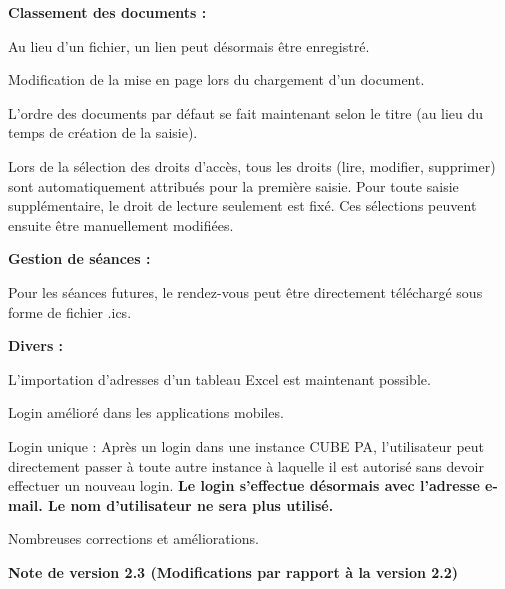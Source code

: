 \textbf{Classement des documents :}
\begin{compactitem}
	\item Au lieu d'un fichier, un lien peut désormais être enregistré.
	\item Modification de la mise en page lors du chargement d'un document.
	\item L'ordre des documents par défaut se fait maintenant selon le titre (au lieu du temps de création de la saisie).
	\item Lors de la sélection des droits d'accès, tous les droits (lire, modifier, supprimer) sont automatiquement attribués pour la première saisie. Pour toute saisie supplémentaire, le droit de lecture seulement est fixé. Ces sélections peuvent ensuite être manuellement modifiées.
\end{compactitem}
\textbf{Gestion de séances :}
\begin{compactitem}
	\item Pour les séances futures, le rendez-vous peut être directement téléchargé sous forme de fichier .ics.
\end{compactitem}
\textbf{Divers :}
\begin{compactitem}
	\item L'importation d'adresses d'un tableau Excel est maintenant possible.
	\item Login amélioré dans les applications mobiles.
	\item Login unique : Après un login dans une instance CUBE PA, l'utilisateur peut directement passer à toute autre instance à laquelle il est autorisé sans devoir effectuer un nouveau login. \textbf{Le login s'effectue désormais avec l'adresse e-mail. Le nom d'utilisateur ne sera plus utilisé.}
	\item Nombreuses corrections et améliorations.
\end{compactitem}

\vspace{\baselineskip}

\textbf{Note de version 2.3 (Modifications par rapport à la version 2.2)} \\

